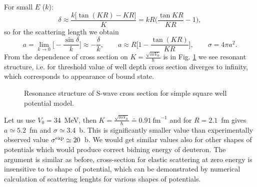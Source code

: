 \documentclass[11pt,a4paper]{article}
\begin{document}
For small $E$ ($k$):
\[
\delta\approx\frac{k\big[\tan(KR)-KR\big]}{K}=kR\Big(\frac{\tan KR}{KR}-1\Big), 
\]
so for the scattering length we obtain 
\[
a=\lim_{k\to0}\Big[-\frac{\sin\delta}{k}\Big]\approx-\frac{\delta}{k},
\qquad
a\approx R\Big[1-\frac{\tan(KR)}{KR}\Big],
\qquad \sigma=4\pi a^2 .
\]
From the dependence of cross section on $K=\frac{\sqrt{mV_0}}{\hbar}$ is in 
Fig. \ref{resonance_cross_section} we see resonant structure, i.e. for threshold value of well depth cross section diverges to infinity, which corresponds to appearance of bound state. 

\begin{figure}
\begin{center}
\end{center}
\caption{Resonance structure of S-wave cross section for simple square well potential model.}
\label{resonance_cross_section}
\end{figure}
Let us use $V_0=34$~MeV, then $K=\frac{\sqrt{mV_0}}{\hbar}\doteq0.91\ \text{fm}^{-1}$ and for $R=2.1$~fm gives $a\simeq5.2$~fm and $\sigma\simeq3.4$~b. This is significantly smaller value than experimentally observed value $\sigma^{\rm exp}\simeq20$~b. We would get similar values also for other shapes of potentials which would produce correct bidning energy of deuteron. The argument is similar as before, cross-section for elastic scattering at zero energy is insensitive to to shape of potential, which can be demonstrated by numerical calculation of scattering lenghts for various shapes of potentials.  
\end{document}
